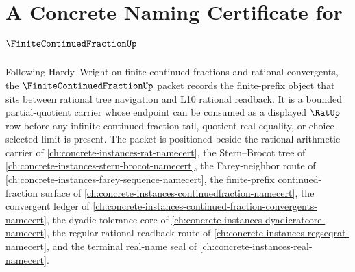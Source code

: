 \chapter{A Concrete Naming Certificate for $\FiniteContinuedFractionUp$}
\label{ch:concrete-instances-finite-continued-fraction-namecert}

Following Hardy--Wright on finite continued fractions and rational convergents, the $\FiniteContinuedFractionUp$ packet records the finite-prefix object that sits between rational tree navigation and L10 rational readback. It is a bounded partial-quotient carrier whose endpoint can be consumed as a displayed $\RatUp$ row before any infinite continued-fraction tail, quotient real equality, or choice-selected limit is present. The packet is positioned beside the rational arithmetic carrier of \autoref{ch:concrete-instances-rat-namecert}, the Stern--Brocot tree of \autoref{ch:concrete-instances-stern-brocot-namecert}, the Farey-neighbor route of \autoref{ch:concrete-instances-farey-sequence-namecert}, the finite-prefix continued-fraction surface of \autoref{ch:concrete-instances-continuedfraction-namecert}, the convergent ledger of \autoref{ch:concrete-instances-continued-fraction-convergents-namecert}, the dyadic tolerance core of \autoref{ch:concrete-instances-dyadicratcore-namecert}, the regular rational readback route of \autoref{ch:concrete-instances-regseqrat-namecert}, and the terminal real-name seal of \autoref{ch:concrete-instances-real-namecert}.

